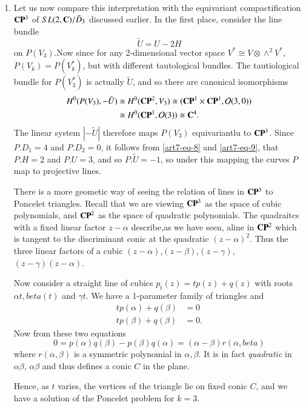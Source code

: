 \begin{example*}

~

\begin{enumerate}[]
 \item Let us now compare this interpretation with the equivariant compactification $\mathbf{C}\mathbf{P}^{3}$ of $SL(2, \mathbf{C})/\tilde{D}_{3}$ discussed earlier. In the first place, consider the line bundle
    $$
    \tilde{U}= U-2H
    $$
    on $P(V_{3})$.Now since for any 2-dimensional vector space $V^{*}\cong V \otimes \wedge^{2}V^{*}$, $P(V_{k})=P(V_{k}^{*})$, but with different tautological bundles. The tautiological bundle for $P(V_{3}^{*})$ is actually $\tilde{U}$, and so there are canonical isomorphisms
    \begin{align*}
    H^{0}(P(V_{3}), -\tilde{U}) &\cong H^{0}(\mathbf{C}\mathbf{P}^{2}, V_{3})\cong (\mathbf{C}\mathbf{P}^{1} \times \mathbf{C}\mathbf{P}^{1}, \mathcal{O}(3, 0))\\
       &\cong H^{0}(\mathbf{C}\mathbf{P}^{1}, \mathcal{O}(3))\cong \mathbf{C}^{4}.
    \end{align*}
    The linear system $|-\tilde{U}|$ therefore maps $P(V_{3})$ equivariantlu to $\mathbf{C}\mathbf{P}^{3}$. Since $P.D_{1} = 4$ and $P.D_{2} = 0$, it follows from \eqref{art7-eq-8} and \eqref{art7-eq-9}, that $P.H = 2$ and $P.U = 3$, and so $P.\tilde{U} = -1$, so under this mapping the curves $P$ map to projective lines.

    There is a more geometic way of seeing the relation of lines in $\mathbf{C}\mathbf{P}^{3}$ to Poncelet triangles. Recall that we are viewing  $\mathbf{C}\mathbf{P}^{3}$ as the space of cubic polynomials, and $\mathbf{C}\mathbf{P}^{2}$ as the space of quadratic polynomials. The quadraitcs with a fixed linear factor $z-\alpha$ describe,as we have seen, aline in $\mathbf{C}\mathbf{P}^{2}$ which is tangent to the discriminant conic at the quadratic $(z-\alpha)^{2}$. Thus the three linear factors of a cubic $(z-\alpha)$,$(z-\beta)$,$(z-\gamma)$, $(z-\gamma) (z-\alpha)$.

    Now consider a straight line of cubics $p_{t}(z)=tp(z)+q(z)$ with roots $\alpha{t}, beta(t)$ and $\gamma{t}$. We have a 1-parameter family of triangles and
    \begin{align*}
    tp(\alpha) + q(\beta) &= 0\\
    tp(\beta) +q(\beta) &=0.
    \end{align*}
    Now from these two equations
    $$
    0 = p(\alpha)q(\beta) -p(\beta)q(\alpha)= (\alpha-\beta)r(\alpha, beta)
    $$
    where $r(\alpha, \beta)$ is a symmetric polynomial in $\alpha,\beta$. It is in fact \textit{quadratic} in $\alpha  \beta$, $\alpha \beta$ and thus defines a conic $C$ in the plane.

    Hence, as $t$ varies, the vertices of the triangle lie on fixed conic $C$, and we have a solution of the Poncelet problem for $k=3$.
    \end{enumerate}
\end{example*}

